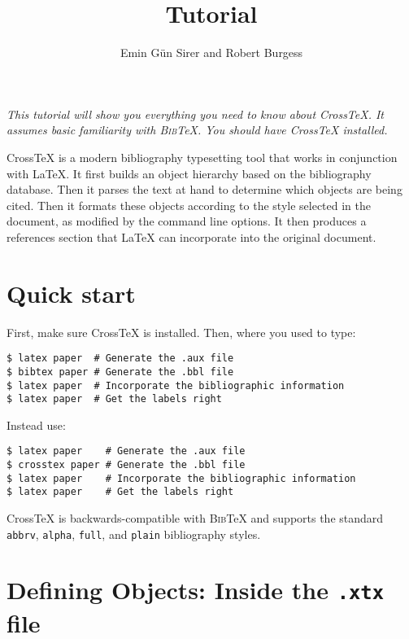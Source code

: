 \documentclass{article}
\title{\XTX{} Tutorial}
\author{Emin G\"un Sirer and Robert Burgess}
\date{}
\newcommand{\XTX}{Cross\TeX}
\newcommand{\BibTeX}{\textsc{Bib}\TeX}
\begin{document}
\maketitle

\textit{
This tutorial will show you everything you need to know about \XTX{}. It
assumes basic familiarity with \BibTeX{}. You should have \XTX{}
installed.
}

\XTX{} is a modern bibliography typesetting tool that works in
conjunction with \LaTeX{}. It first builds an object hierarchy based on
the bibliography database. Then it parses the text at hand to determine
which objects are being cited. Then it formats these objects according
to the style selected in the document, as modified by the command
line options. It then produces a references section that \LaTeX{} can
incorporate into the original document.



\section{Quick start}

First, make sure \XTX{} is installed. Then, where you used to type:

\begin{small}\begin{verbatim}
$ latex paper  # Generate the .aux file
$ bibtex paper # Generate the .bbl file
$ latex paper  # Incorporate the bibliographic information
$ latex paper  # Get the labels right
\end{verbatim}\end{small}

Instead use:

\begin{small}\begin{verbatim}
$ latex paper    # Generate the .aux file
$ crosstex paper # Generate the .bbl file
$ latex paper    # Incorporate the bibliographic information
$ latex paper    # Get the labels right
\end{verbatim}\end{small}

\XTX{} is backwards-compatible with \BibTeX{} and supports the standard
\texttt{abbrv}, \texttt{alpha}, \texttt{full}, and \texttt{plain}
bibliography styles.

\section{Defining Objects: Inside the \texttt{.xtx} file\label{sec:objects}}
\end{document}
